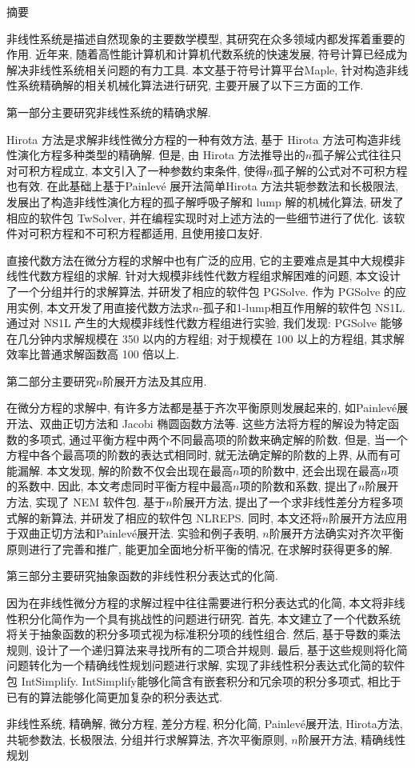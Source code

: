 {}
\centerline{\heiti 摘\quad 要}

\linespread{1.4} \bigskip

非线性系统是描述自然现象的主要数学模型, 其研究在众多领域内都发挥着重要的作用. 近年来, 随着高性能计算机和计算机代数系统的快速发展, 符号计算已经成为解决非线性系统相关问题的有力工具. 本文基于符号计算平台Maple, 针对构造非线性系统精确解的相关机械化算法进行研究, 主要开展了以下三方面的工作.

第一部分主要研究非线性系统的精确求解.

Hirota 方法是求解非线性微分方程的一种有效方法, 基于 Hirota 方法可构造非线性演化方程多种类型的精确解. 但是, 由 Hirota 方法推导出的$n$孤子解公式往往只对可积方程成立, 本文引入了一种参数约束条件, 使得$n$孤子解的公式对不可积方程也有效. 在此基础上基于Painlevé 展开法\D 简单Hirota 方法\D 共轭参数法和长极限法, 发展出了构造非线性演化方程的孤子解\D 呼吸子解和 lump 解的机械化算法, 研发了相应的软件包 TwSolver, 并在编程实现时对上述方法的一些细节进行了优化. 该软件对可积方程和不可积方程都适用, 且使用接口友好. 

直接代数方法在微分方程的求解中也有广泛的应用, 它的主要难点是其中大规模非线性代数方程组的求解. 针对大规模非线性代数方程组求解困难的问题, 本文设计了一个分组并行的求解算法, 并研发了相应的软件包 PGSolve. 作为 PGSolve 的应用实例, 本文开发了用直接代数方法求$n$-孤子和1-lump相互作用解的软件包 NS1L. 通过对 NS1L 产生的大规模非线性代数方程组进行实验, 我们发现: PGSolve 能够在几分钟内求解规模在 350 以内的方程组; 对于规模在 100 以上的方程组, 其求解效率比普通求解函数高 100 倍以上. 

第二部分主要研究$n$阶展开方法及其应用. 

在微分方程的求解中, 有许多方法都是基于齐次平衡原则发展起来的, 如Painlevé展开法、双曲正切方法和 Jacobi 椭圆函数方法等. 这些方法将方程的解设为特定函数的多项式, 通过平衡方程中两个不同最高项的阶数来确定解的阶数. 但是, 当一个方程中各个最高项的阶数的表达式相同时, 就无法确定解的阶数的上界, 从而有可能漏解. 本文发现, 解的阶数不仅会出现在最高$n$项的阶数中, 还会出现在最高$n$项的系数中. 因此, 本文考虑同时平衡方程中最高$n$项的阶数和系数, 提出了$n$阶展开方法, 实现了 NEM 软件包. 基于$n$阶展开方法, 提出了一个求非线性差分方程多项式解的新算法, 并研发了相应的软件包 NLREPS. 同时, 本文还将$n$阶展开方法应用于双曲正切方法和Painlevé展开法. 实验和例子表明, $n$阶展开方法确实对齐次平衡原则进行了完善和推广, 能更加全面地分析平衡的情况, 在求解时获得更多的解. 

第三部分主要研究抽象函数的非线性积分表达式的化简.

因为在非线性微分方程的求解过程中往往需要进行积分表达式的化简, 本文将非线性积分化简作为一个具有挑战性的问题进行研究. 首先, 本文建立了一个代数系统将关于抽象函数的积分多项式视为标准积分项的线性组合. 然后, 基于导数的乘法规则, 设计了一个递归算法来寻找所有的二项合并规则. 最后, 基于这些规则将化简问题转化为一个精确线性规划问题进行求解, 实现了非线性积分表达式化简的软件包 IntSimplify.  IntSimplify能够化简含有嵌套积分和冗余项的积分多项式, 相比于已有的算法能够化简更加复杂的积分表达式. 

\bigskip

非线性系统, 精确解, 微分方程, 差分方程, 积分化简, Painlevé展开法, Hirota方法, 共轭参数法, 长极限法, 分组并行求解算法, 齐次平衡原则, $n$阶展开方法, 精确线性规划
